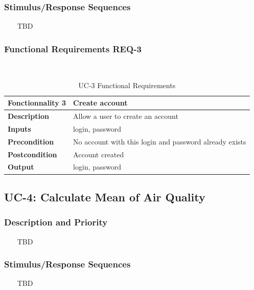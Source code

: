 \documentclass{report}
\begin{document}
\subsubsection*{Stimulus/Response Sequences} ~~~
TBD
\subsubsection*{Functional Requirements REQ-3} ~~~
\begin{table}[H]
	\begin{center}
		\begin{tabular}{|m{4cm}|m{10cm}|}
		\hline
		\textbf{Fonctionnality 3} & Create account \\
		\hline
		\textbf{Description} & Allow a user to create an account \\
		\hline
		\textbf{Inputs} & login, password \\
		\hline
		\textbf{Precondition} & No account with this login and password already exists \\
		\hline
		\textbf{Postcondition} & Account created \\
		\hline
		\textbf{Output} & login, password \\
		\hline
		\end{tabular}
	\end{center}
	\caption{UC-3 Functional Requirements}
	\label{table:REQ-3}
\end{table}

\subsection{UC-4: Calculate Mean of Air Quality}

\subsubsection*{Description and Priority} ~~~
TBD

\subsubsection*{Stimulus/Response Sequences} ~~~
TBD
\end{document}

